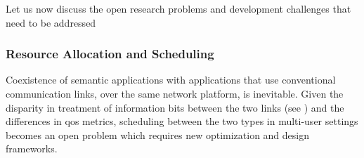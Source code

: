 
Let us now discuss the open research problems and development challenges that need to be addressed 

\subsubsection{Resource Allocation and Scheduling}
Coexistence of  semantic applications with applications that use conventional communication links, over the same network platform, is inevitable. Given the  disparity in treatment of information bits between the two links (see )  and the differences in \gls{qos} metrics, scheduling between the two types in multi-user settings becomes an open problem which requires new optimization and design frameworks.
